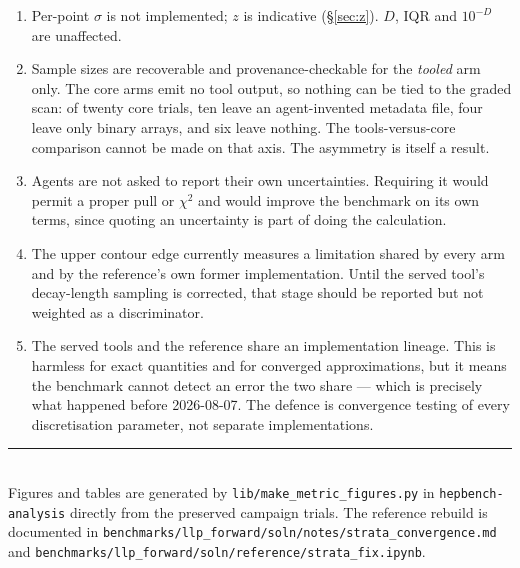 \documentclass[11pt]{article}
\begin{document}
\begin{enumerate}
\item Per-point $\sigma$ is not implemented; $z$ is indicative
  (\S\ref{sec:z}). $D$, IQR and $10^{-D}$ are unaffected.
\item Sample sizes are recoverable and provenance-checkable for the
  \emph{tooled} arm only. The core arms emit no tool output, so nothing can be
  tied to the graded scan: of twenty core trials, ten leave an agent-invented
  metadata file, four leave only binary arrays, and six leave nothing. The
  tools-versus-core comparison cannot be made on that axis. The asymmetry is
  itself a result.
\item Agents are not asked to report their own uncertainties. Requiring it would
  permit a proper pull or $\chi^2$ and would improve the benchmark on its own
  terms, since quoting an uncertainty is part of doing the calculation.
\item The upper contour edge currently measures a limitation shared by every
  arm and by the reference's own former implementation. Until the served tool's
  decay-length sampling is corrected, that stage should be reported but not
  weighted as a discriminator.
\item The served tools and the reference share an implementation lineage. This
  is harmless for exact quantities and for converged approximations, but it
  means the benchmark cannot detect an error the two share --- which is
  precisely what happened before 2026-08-07. The defence is convergence testing
  of every discretisation parameter, not separate implementations.
\end{enumerate}

\vspace{1em}
\noindent\rule{\textwidth}{0.4pt}\\[0.3em]
{\small Figures and tables are generated by
\texttt{lib/make\_metric\_figures.py} in \texttt{hepbench-analysis} directly from the preserved
campaign trials. The reference rebuild is documented in
\texttt{benchmarks/llp_forward/soln/notes/strata\_convergence.md} and
\texttt{benchmarks/llp\_forward/soln/reference/strata\_fix.ipynb}.}
\end{document}
